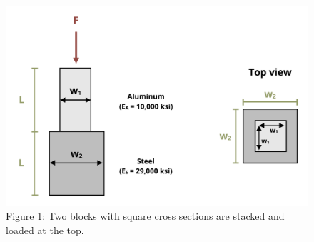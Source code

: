 \documentclass[
  letterpaper,
  DIV=11,
  numbers=noendperiod]{scrreprt}
\begin{document}
\begin{figure}[H]

{\centering \includegraphics{images/193.png}

}

\caption{Figure 1: Two blocks with square cross sections are stacked and
loaded at the top.}

\end{figure}%
\end{document}
